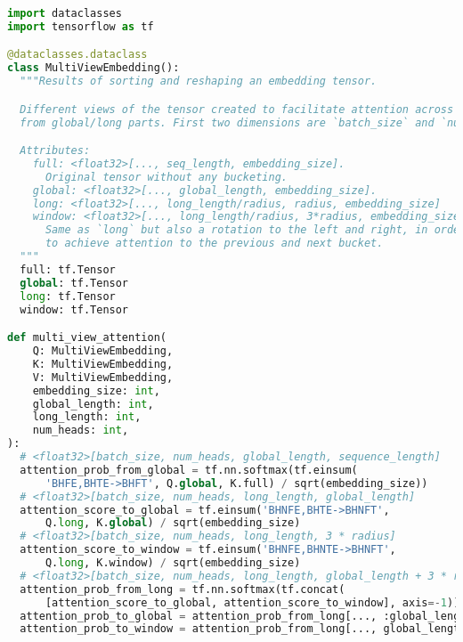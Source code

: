 \documentclass[11pt]{article}
\begin{document}

\lstset{style=mystyle}

\begin{figure*}\begin{center}
{\small
\begin{lstlisting}[language=Python]
import dataclasses
import tensorflow as tf

@dataclasses.dataclass
class MultiViewEmbedding():
  """Results of sorting and reshaping an embedding tensor.

  Different views of the tensor created to facilitate attention across tokens
  from global/long parts. First two dimensions are `batch_size` and `num_heads`:

  Attributes:
    full: <float32>[..., seq_length, embedding_size]. 
      Original tensor without any bucketing.
    global: <float32>[..., global_length, embedding_size].
    long: <float32>[..., long_length/radius, radius, embedding_size]
    window: <float32>[..., long_length/radius, 3*radius, embedding_size]
      Same as `long` but also a rotation to the left and right, in order
      to achieve attention to the previous and next bucket.
  """
  full: tf.Tensor
  global: tf.Tensor
  long: tf.Tensor
  window: tf.Tensor

def multi_view_attention(
    Q: MultiViewEmbedding,
    K: MultiViewEmbedding,
    V: MultiViewEmbedding,
    embedding_size: int,
    global_length: int,
    long_length: int,
    num_heads: int,
):
  # <float32>[batch_size, num_heads, global_length, sequence_length]
  attention_prob_from_global = tf.nn.softmax(tf.einsum(
      'BHFE,BHTE->BHFT', Q.global, K.full) / sqrt(embedding_size))
  # <float32>[batch_size, num_heads, long_length, global_length]
  attention_score_to_global = tf.einsum('BHNFE,BHTE->BHNFT',
      Q.long, K.global) / sqrt(embedding_size)
  # <float32>[batch_size, num_heads, long_length, 3 * radius]
  attention_score_to_window = tf.einsum('BHNFE,BHNTE->BHNFT',
      Q.long, K.window) / sqrt(embedding_size)
  # <float32>[batch_size, num_heads, long_length, global_length + 3 * radius]
  attention_prob_from_long = tf.nn.softmax(tf.concat(
      [attention_score_to_global, attention_score_to_window], axis=-1))
  attention_prob_to_global = attention_prob_from_long[..., :global_length]
  attention_prob_to_window = attention_prob_from_long[..., global_length:]


\end{lstlisting}}
\end{center}
\end{figure*}
\end{document}

